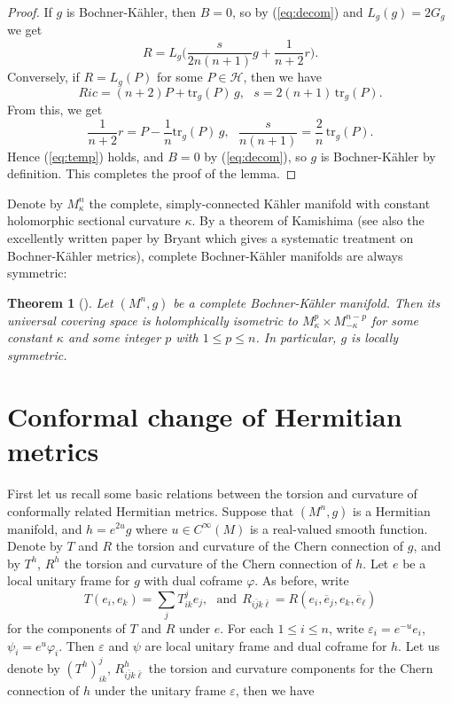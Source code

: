 \documentclass{amsart}
\newtheorem{theorem}{Theorem}%
\numberwithin{equation}{section}
\begin{document}
 \begin{proof}
If $g$ is Bochner-K\"ahler, then $B=0$, so by (\ref{eq:decom}) and $L_g(g)=2G_g$ we get
\begin{equation} \label{eq:temp}
 R = L_g\big(\frac{s}{2n(n+1)}g + \frac{1}{n+2}r\big).
 \end{equation}
Conversely, if $R=L_g(P)$ for some $P\in {\mathcal H}$, then we have
$$ Ric = (n+2)P + \mbox{tr}_g(P)\,g, \ \ \ s =2(n+1) \,\mbox{tr}_g(P).$$
From this, we get
$$ \frac{1}{n+2}r= P - \frac{1}{n}\mbox{tr}_g(P)\,g , \ \ \ \frac{s}{n(n+1)} = \frac{2}{n} \,\mbox{tr}_g(P).  $$
Hence (\ref{eq:temp}) holds, and $B=0$ by (\ref{eq:decom}), so $g$ is Bochner-K\"ahler by definition. This completes the proof of the lemma.
 \end{proof}


Denote by $M^n_{\kappa}$  the complete, simply-connected K\"ahler manifold with constant holomorphic sectional curvature $\kappa$. By a theorem of Kamishima \cite{Kamishima1994} (see also the excellently written paper by Bryant \cite{Bryant} which gives a systematic treatment on Bochner-K\"ahler metrics), complete Bochner-K\"ahler manifolds are always symmetric:
\begin{theorem}[\cite{Kamishima1994, Bryant}] \label{thm4}
Let $(M^n,g)$ be a complete Bochner-K\"ahler manifold. Then its universal covering space is holomphically isometric to $M^p_{\kappa}\times M^{n-p}_{-\kappa}$ for some constant $\kappa$ and some  integer $p$ with $1\leq p\leq n$. In particular, $g$ is locally symmetric.
\end{theorem}



\vspace{0.3cm}

\section{Conformal change of Hermitian metrics}

First let us recall some basic relations between the torsion and curvature of conformally related Hermitian metrics. Suppose that $(M^n,g)$ is a Hermitian manifold, and $h =e^{2u}g$ where $u \in C^{\infty}(M)$ is a real-valued smooth function. Denote by $T$ and $R$ the torsion and curvature of the Chern connection of $g$, and by $T^h$, $R^h$ the torsion and curvature of the Chern connection of $h$. Let $e$ be a local unitary frame for $g$ with dual coframe $\varphi$. As before, write
$$T(e_i, e_k) = \sum_j T^j_{ik}e_j, \ \ \ \mbox{and} \ \  R_{i\bar{j}k\bar{\ell}}=R(e_i,\overline{e}_j, e_k, \overline{e}_{\ell}) $$
for the components of $T$ and $R$ under $e$. For each $1\leq i\leq n$,   write $\varepsilon_i=e^{-u}e_i$, $\psi_i=e^u\varphi_i$. Then $\varepsilon$ and $\psi$ are local unitary frame and dual coframe for $h$. Let us denote by $(T^h)^j_{ik}$, $R^h_{i\bar{j}k\bar{\ell}}$ the torsion and curvature components for the Chern connection of $h$ under the unitary frame $\varepsilon$, then we have
\end{document}

